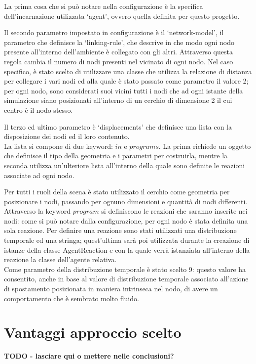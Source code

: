 La prima cosa che si può notare nella configurazione è la specifica dell'incarnazione utilizzata `agent', ovvero quella definita per questo progetto.

Il secondo parametro impostato in configurazione è il `network-model', il parametro che definisce la `linking-rule', che descrive in che modo ogni nodo presente all'interno dell'ambiente è collegato con gli altri. Attraverso questa regola cambia il numero di nodi presenti nel vicinato di ogni nodo. Nel caso specifico, è stato scelto di utilizzare una classe che utilizza la relazione di distanza per collegare i vari nodi ed alla quale è stato passato come parametro il valore 2; per ogni nodo, sono considerati suoi vicini tutti i nodi che ad ogni istante della simulazione siano posizionati all'interno di un cerchio di dimensione 2 il cui centro è il nodo stesso.

Il terzo ed ultimo parametro è `displacements' che definisce una lista con la disposizione dei nodi ed il loro contenuto.
\\
La lista si compone di due keyword: $in$ e $programs$. La prima richiede un oggetto che definisce il tipo della geometria e i parametri per costruirla, mentre la seconda utilizza un'ulteriore lista all'interno della quale sono definite le reazioni associate ad ogni nodo.

Per tutti i ruoli della scena è stato utilizzato il cerchio come geometria per posizionare i nodi, passando per ognuno dimensioni e quantità di nodi differenti.
\\
Attraverso la keyword $program$ si definiscono le reazioni che saranno inserite nei nodi: come si può notare dalla configurazione, per ogni nodo è stata definita una sola reazione.
Per definire una reazione sono stati utilizzati una distribuzione temporale ed una stringa; quest'ultima sarà poi utilizzata durante la creazione di istanze della classe AgentReaction e con la quale verrà istanziata all'interno della reazione la classe dell'agente relativa.
\\
Come parametro della distribuzione temporale è stato scelto 9: questo valore ha consentito, anche in base al valore di distribuzione temporale associato all'azione di spostamento posizionata in maniera intrinseca nel nodo, di avere un comportamento che è sembrato molto fluido.



\section{Vantaggi approccio scelto}
\textbf{TODO - lasciare qui o mettere nelle conclusioni?}
